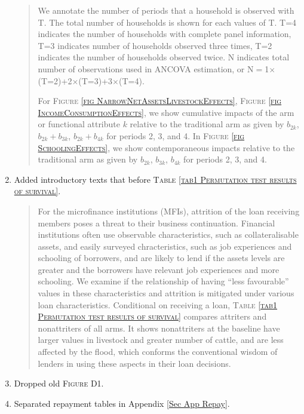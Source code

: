 \begin{enumerate}
\begin{quotation}
	\hspace{1em}We annotate the number of periods that a household is observed with \textsf{T}. The total number of households is shown for each values of \textsf{T}. \textsf{T=4} indicates the number of households with complete panel information, \textsf{T=3} indicates number of households observed three times, \textsf{T=2} indicates the number of households observed twice. \textsf{N} indicates total number of observations used in ANCOVA estimation, or \textsf{N$=$1$\times$(T=2)+2$\times$(T=3)+3$\times$(T=4)}. 
	
	\hspace{1em}For \textsc{\footnotesize Figure \ref{fig NarrowNetAssetsLivestockEffects}}, \textsc{\small Figure \ref{fig IncomeConsumptionEffects}}, we show cumulative impacts of the arm or functional attribute $k$ relative to the \textsf{traditional} arm as given by $b_{2k}$, $b_{2k}+b_{3k}$,  $b_{2k}+b_{4k}$ for periods 2, 3, and 4. In \textsc{\footnotesize Figure \ref{fig SchoolingEffects}}, we show contemporaneous impacts relative to the \textsf{traditional} arm as given by $b_{2k}$, $b_{3k}$,  $b_{4k}$ for periods 2, 3, and 4.
\end{quotation}
\item	Added introductory texts that before \textsc{\normalsize Table \ref{tab1 Permutation test results of survival}}.
\begin{quotation}
	For the microfinance institutions (MFIs), attrition of the loan receiving members poses a threat to their business continuation. Financial institutions often use observable characteristics, such as collateralisable assets, and easily surveyed chracteristics, such as job experiences and schooling of borrowers, and are likely to lend if the assets levels are greater and the borrowers have relevant job experiences and more schooling. We examine if the relationship of having ``less favourable'' values in these characteristics and attrition is mitigated under various loan characteristics. Conditional on receiving a loan, \textsc{\normalsize Table \ref{tab1 Permutation test results of survival}} compares attriters and nonattriters of all arms. It shows nonattriters at the baseline have larger values in livestock and greater number of cattle, and are less affected by the flood, which conforms the conventional wisdom of lenders in using these aspects in their loan decisions. 
	\end{quotation}
\item	Dropped old \textsc{Figure D1}.
\item	Separated repayment tables in Appendix \ref{Sec App Repay}.
\end{enumerate}
